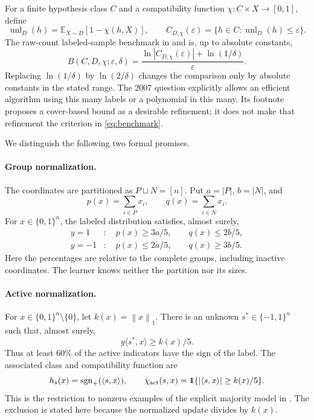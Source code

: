 \documentclass[11pt,a4paper]{article}
\theoremstyle{remark}
\newcommand{\sgnplus}{\operatorname{sgn}_{+}}
\newcommand{\unl}{\operatorname{unl}}
\newcommand{\norm}[1]{\left\lVert#1\right\rVert}
\newcommand{\ip}[2]{\langle #1,#2\rangle}
\newcommand{\1}{\mathbf 1}
\begin{document}
For a finite hypothesis class $C$ and a compatibility function
$\chi:C\times X\to[0,1]$, define
\[
 \unl_D(h)=\mathbb E_{X\sim D}[1-\chi(h,X)],
 \qquad
 C_{D,\chi}(\varepsilon)=\{h\in C:\unl_D(h)\le\varepsilon\}.
\]
The raw-count labeled-sample benchmark in \cite[Section 3]{bb2007} and
\cite[Theorem 4]{bb2010} is, up to absolute constants,
\begin{equation}\label{eq:benchmark}
 B(C,D,\chi;\varepsilon,\delta)
 =\frac{\ln|C_{D,\chi}(\varepsilon)|+\ln(1/\delta)}{\varepsilon}.
\end{equation}
Replacing $\ln(1/\delta)$ by $\ln(2/\delta)$ changes the comparison only by
absolute constants in the stated range. The 2007 question explicitly allows
an efficient algorithm using this many labels or a polynomial in this many.
Its footnote proposes a cover-based bound as a desirable refinement; it does
not make that refinement the criterion in \eqref{eq:benchmark}.

We distinguish the following two formal promises.

\paragraph{Group normalization.}
The coordinates are partitioned as $P\sqcup N=[n]$. Put $a=|P|$, $b=|N|$, and
\[
 p(x)=\sum_{i\in P}x_i,\qquad q(x)=\sum_{i\in N}x_i.
\]
For $x\in\{0,1\}^n$, the labeled distribution satisfies, almost surely,
\begin{align}
 y=1&:\quad p(x)\ge3a/5,\qquad q(x)\le2b/5, \label{eq:groupplus}\\
 y=-1&:\quad p(x)\le2a/5,\qquad q(x)\ge3b/5. \label{eq:groupminus}
\end{align}
Here the percentages are relative to the complete groups, including inactive
coordinates. The learner knows neither the partition nor its sizes.

\paragraph{Active normalization.}
For $x\in\{0,1\}^n\setminus\{0\}$, let $k(x)=\norm{x}_1$. There is an unknown
$s^*\in\{-1,1\}^n$ such that, almost surely,
\begin{equation}\label{eq:activepromise}
 y\ip{s^*}{x}\ge k(x)/5.
\end{equation}
Thus at least 60\% of the active indicators have the sign of the label.
The associated class and compatibility function are
\begin{equation}\label{eq:activeclass}
 h_s(x)=\sgnplus(\ip{s}{x}),\qquad
 \chi_{\rm act}(s,x)=
 \1\{|\ip{s}{x}|\ge k(x)/5\}.
\end{equation}
This is the restriction to nonzero examples of the explicit majority model
in \cite[Appendix A.2]{bb2014supp}. The exclusion is stated here because the
normalized update divides by $k(x)$.
\end{document}
